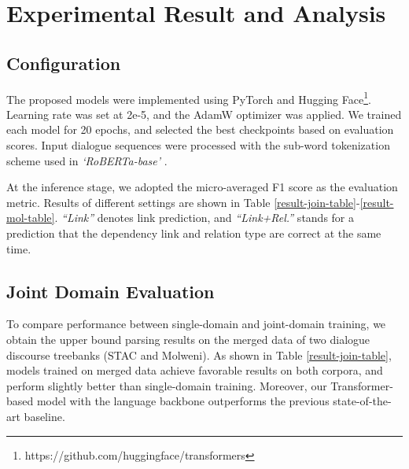 \documentclass[11pt]{article}
\begin{document}
\section{Experimental Result and Analysis}
\subsection{Configuration} 
The proposed models were implemented using PyTorch \citep{paszke2019pytorch} and Hugging Face\footnote{https://github.com/huggingface/transformers}. Learning rate was set at 2e-5, and the AdamW \cite{loshchilov2017-adamW} optimizer was applied. We trained each model for 20 epochs, and selected the best checkpoints based on evaluation scores. Input dialogue sequences were processed with the sub-word tokenization scheme used in \textit{`RoBERTa-base'} \cite{liu2019roberta}.

At the inference stage, we adopted the micro-averaged F1 score as the evaluation metric. Results of different settings are shown in Table \ref{result-join-table}-\ref{result-mol-table}. \textit{``Link''} denotes link prediction, and \textit{``Link+Rel.''} stands for a prediction that the dependency link and relation type are correct at the same time.

\subsection{Joint Domain Evaluation}
To compare performance between single-domain and joint-domain training, we obtain the upper bound parsing results on the merged data of two dialogue discourse treebanks (STAC and Molweni). As shown in Table \ref{result-join-table}, models trained on merged data achieve favorable results on both corpora, and perform slightly better than single-domain training. Moreover, our Transformer-based model with the language backbone outperforms the previous state-of-the-art baseline.
\end{document}
